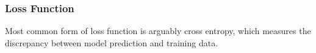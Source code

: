 \subsubsection{Loss Function}

Most common form of loss function is arguably cross entropy, which measures the discrepancy between model prediction and training data.